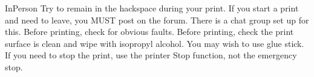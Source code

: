 	{InPerson}%
	{Try to remain in the hackspace during your print. If you start a print and need to leave, you MUST post on the forum. There is a chat group set up for this.
 Before printing, check for obvious faults.
 Before printing, check the print surface is clean and wipe with isopropyl alcohol. You may wish to use glue stick.
 If you need to stop the print, use the printer Stop function, not the emergency stop.
 } %
	{%
}
